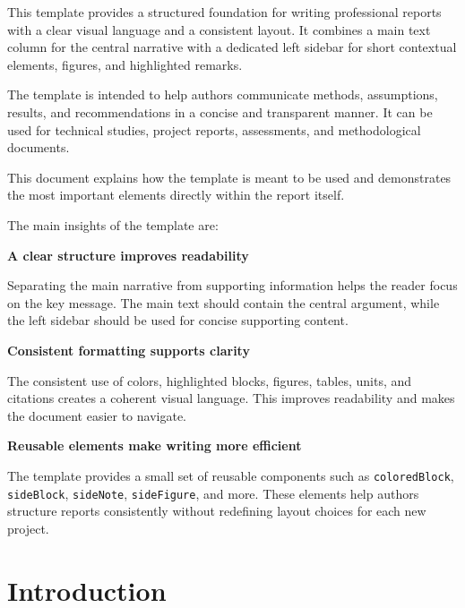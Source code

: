 \documentclass[11pt,a4paper]{report}
\begin{document}
This template provides a structured foundation for writing professional reports with a clear visual language and a consistent layout. It combines a main text column for the central narrative with a dedicated left sidebar for short contextual elements, figures, and highlighted remarks.

The template is intended to help authors communicate methods, assumptions, results, and recommendations in a concise and transparent manner. It can be used for technical studies, project reports, assessments, and methodological documents.

This document explains how the template is meant to be used and demonstrates the most important elements directly within the report itself.

The main insights of the template are:

\ieeline
{}
{\Large\color{subtitle}\textbf{A clear structure improves readability}}

Separating the main narrative from supporting information helps the reader focus on the key message. The main text should contain the central argument, while the left sidebar should be used for concise supporting content.

\ieeline
{}
{\Large\color{subtitle}\textbf{Consistent formatting supports clarity}}

The consistent use of colors, highlighted blocks, figures, tables, units, and citations creates a coherent visual language. This improves readability and makes the document easier to navigate.

\ieeline
{}
{\Large\color{subtitle}\textbf{Reusable elements make writing more efficient}}

The template provides a small set of reusable components such as \texttt{coloredBlock}, \texttt{sideBlock}, \texttt{sideNote},   \texttt{sideFigure}, and more. These elements help authors structure reports consistently without redefining layout choices for each new project.

\clearpage


\chapter{Introduction}
\end{document}
